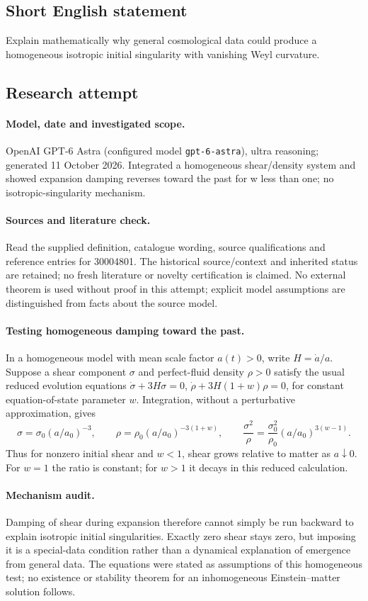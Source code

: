 \documentclass[11pt]{article}
\begin{document}
\subsection{Short English statement}
Explain mathematically why general cosmological data could produce a homogeneous isotropic initial singularity with vanishing Weyl curvature.
\subsection{Research attempt}
\paragraph{Model, date and investigated scope.}
OpenAI GPT-6 Astra (configured model \texttt{gpt-6-astra}), ultra reasoning; generated 11 October 2026. Integrated a homogeneous shear/density system and showed expansion damping reverses toward the past for w less than one; no isotropic-singularity mechanism.

\paragraph{Sources and literature check.}
Read the supplied definition, catalogue wording, source qualifications and reference entries for 30004801. The historical source/context and inherited status are retained; no fresh literature or novelty certification is claimed. No external theorem is used without proof in this attempt; explicit model assumptions are distinguished from facts about the source model.

\paragraph{Testing homogeneous damping toward the past.} In a homogeneous model with mean scale factor \(a(t)>0\), write \(H=\dot a/a\). Suppose a shear component \(\sigma\) and perfect-fluid density \(\rho>0\) satisfy the usual reduced evolution equations \(\dot\sigma+3H\sigma=0\), \(\dot\rho+3H(1+w)\rho=0\), for constant equation-of-state parameter \(w\). Integration, without a perturbative approximation, gives
\[
 \sigma=\sigma_0(a/a_0)^{-3},\qquad
 \rho=\rho_0(a/a_0)^{-3(1+w)},\qquad
 \frac{\sigma^2}{\rho}=\frac{\sigma_0^2}{\rho_0}(a/a_0)^{3(w-1)}.
\]
Thus for nonzero initial shear and \(w<1\), shear grows relative to matter as \(a\downarrow0\). For \(w=1\) the ratio is constant; for \(w>1\) it decays in this reduced calculation.
\paragraph{Mechanism audit.} Damping of shear during expansion therefore cannot simply be run backward to explain isotropic initial singularities. Exactly zero shear stays zero, but imposing it is a special-data condition rather than a dynamical explanation of emergence from general data. The equations were stated as assumptions of this homogeneous test; no existence or stability theorem for an inhomogeneous Einstein--matter solution follows.
\end{document}
